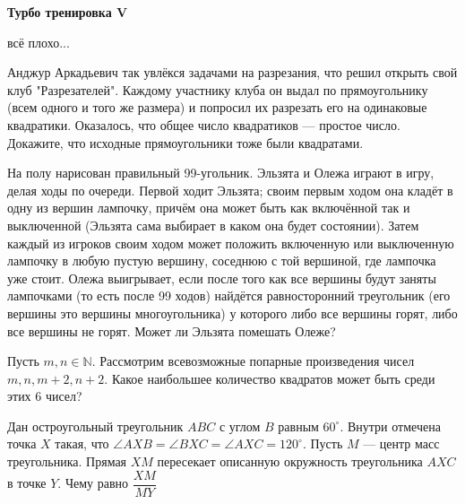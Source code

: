 \centerline{\bf \Huge Турбо тренировка V}
\centerline{\bf \Huge }

\begin{flushright}
        \scriptsize{всё плохо...}
\end{flushright}

Анджур Аркадьевич так увлёкся задачами на разрезания, что решил открыть свой клуб "Разрезателей". Каждому участнику клуба он выдал по прямоугольнику (всем одного и того же размера) и попросил их разрезать его на одинаковые квадратики. Оказалось, что общее число квадратиков --- простое число. Докажите, что исходные прямоугольники тоже были квадратами.

На полу нарисован правильный 99-угольник. Эльзята и Олежа играют в игру, делая ходы по очереди. Первой ходит Эльзята; своим первым ходом она кладёт в одну из вершин лампочку, причём она может быть как включённой так и выключенной (Эльзята сама выбирает в каком она будет состоянии). Затем каждый из игроков своим ходом может положить включенную или выключенную лампочку в любую пустую вершину, соседнюю с той вершиной, где лампочка уже стоит. Олежа выигрывает, если после того как все вершины будут заняты лампочками (то есть после 99 ходов) найдётся равносторонний треугольник (его вершины это вершины многоугольника) у которого либо все вершины горят, либо все вершины не горят. Может ли Эльзята помешать Олеже?

Пусть $m, n \in \mathbb{N}.$ Рассмотрим всевозможные попарные произведения чисел $m, n, m+2, n+2$. Какое наибольшее количество квадратов может быть среди этих 6 чисел?

Дан остроугольный треугольник $ABC$ с углом $B$ равным $60^{\circ}$. Внутри отмечена точка $X$ такая, что $\angle AXB =\angle BXC=\angle AXC = 120^{\circ}$. Пусть $M$ --- центр масс треугольника. Прямая $XM$ пересекает описанную окружность треугольника $AXC$ в точке $Y$. Чему равно $\dfrac{XM}{MY}$